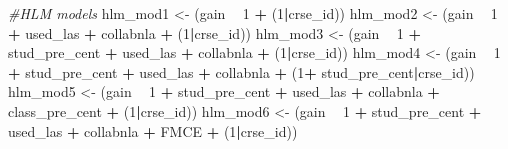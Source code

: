 \documentclass[]{article}
\newenvironment{Shaded}{\begin{snugshade}}{\end{snugshade}}
\newcommand{\DecValTok}[1]{\textcolor[rgb]{0.00,0.00,0.81}{#1}}
\newcommand{\StringTok}[1]{\textcolor[rgb]{0.31,0.60,0.02}{#1}}
\newcommand{\CommentTok}[1]{\textcolor[rgb]{0.56,0.35,0.01}{\textit{#1}}}
\newcommand{\OperatorTok}[1]{\textcolor[rgb]{0.81,0.36,0.00}{\textbf{#1}}}
\newcommand{\NormalTok}[1]{#1}
\begin{document}
\begin{Shaded}
\begin{Highlighting}[]
\CommentTok{#HLM models}
\NormalTok{hlm_mod1 <-}\StringTok{ }\NormalTok{(gain }\OperatorTok{~}\StringTok{ }\DecValTok{1} \OperatorTok{+}\StringTok{ }\NormalTok{(}\DecValTok{1}\OperatorTok{|}\NormalTok{crse_id))}
\NormalTok{hlm_mod2 <-}\StringTok{ }\NormalTok{(gain }\OperatorTok{~}\StringTok{ }\DecValTok{1} \OperatorTok{+}\StringTok{ }\NormalTok{used_las }\OperatorTok{+}\StringTok{ }\NormalTok{collabnla }\OperatorTok{+}\StringTok{ }\NormalTok{(}\DecValTok{1}\OperatorTok{|}\NormalTok{crse_id))}
\NormalTok{hlm_mod3 <-}\StringTok{ }\NormalTok{(gain }\OperatorTok{~}\StringTok{ }\DecValTok{1} \OperatorTok{+}\StringTok{ }\NormalTok{stud_pre_cent }\OperatorTok{+}\StringTok{  }\NormalTok{used_las }\OperatorTok{+}\StringTok{ }\NormalTok{collabnla }\OperatorTok{+}\StringTok{ }\NormalTok{(}\DecValTok{1}\OperatorTok{|}\NormalTok{crse_id)) }
\NormalTok{hlm_mod4 <-}\StringTok{ }\NormalTok{(gain }\OperatorTok{~}\StringTok{ }\DecValTok{1} \OperatorTok{+}\StringTok{ }\NormalTok{stud_pre_cent }\OperatorTok{+}\StringTok{  }\NormalTok{used_las }\OperatorTok{+}\StringTok{ }\NormalTok{collabnla }\OperatorTok{+}\StringTok{ }\NormalTok{(}\DecValTok{1}\OperatorTok{+}\StringTok{ }\NormalTok{stud_pre_cent}\OperatorTok{|}\NormalTok{crse_id))}
\NormalTok{hlm_mod5 <-}\StringTok{ }\NormalTok{(gain }\OperatorTok{~}\StringTok{ }\DecValTok{1} \OperatorTok{+}\StringTok{ }\NormalTok{stud_pre_cent }\OperatorTok{+}\StringTok{  }\NormalTok{used_las }\OperatorTok{+}\StringTok{ }\NormalTok{collabnla }\OperatorTok{+}\StringTok{ }\NormalTok{class_pre_cent }\OperatorTok{+}\StringTok{ }\NormalTok{(}\DecValTok{1}\OperatorTok{|}\NormalTok{crse_id))}
\NormalTok{hlm_mod6 <-}\StringTok{ }\NormalTok{(gain }\OperatorTok{~}\StringTok{ }\DecValTok{1} \OperatorTok{+}\StringTok{ }\NormalTok{stud_pre_cent }\OperatorTok{+}\StringTok{  }\NormalTok{used_las }\OperatorTok{+}\StringTok{ }\NormalTok{collabnla }\OperatorTok{+}\StringTok{ }\NormalTok{FMCE }\OperatorTok{+}\StringTok{ }\NormalTok{(}\DecValTok{1}\OperatorTok{|}\NormalTok{crse_id))}


\end{Highlighting}
\end{Shaded}
\end{document}
